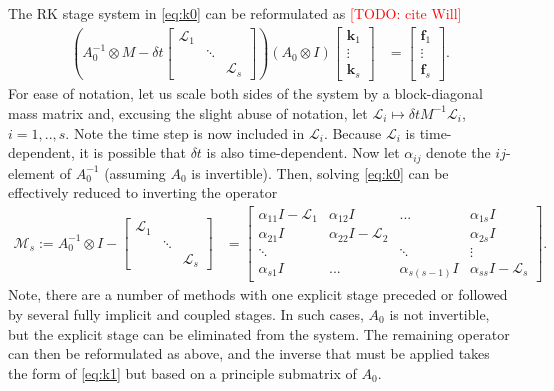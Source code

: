 \documentclass[a4paper,10pt]{article}
\makeatletter
\newcommand{\todo}[1]{\textcolor{red}{[TODO\@: #1]}}
\makeatother
\begin{document}
The RK stage system in \eqref{eq:k0} can be reformulated as \todo{cite Will}
%
\begin{align*}
\left( A_0^{-1}\otimes M - \delta t \begin{bmatrix} \mathcal{L}_1  & \\ & \ddots \\ && \mathcal{L}_s\end{bmatrix}\right)
	(A_0\otimes I)	\begin{bmatrix} \mathbf{k}_1 \\ \vdots \\ \mathbf{k}_s \end{bmatrix} 
& = \begin{bmatrix} \mathbf{f}_1 \\ \vdots \\ \mathbf{f}_s \end{bmatrix}.
\end{align*}
%
For ease of notation, let us scale both sides of the system by a block-diagonal mass matrix 
and, excusing the slight abuse of notation, let $\mathcal{L}_i \mapsto \delta t M^{-1}\mathcal{L}_i$,
$i=1,..,s$. Note the time step is now included in $\mathcal{L}_i$. Because $\mathcal{L}_i$ is
time-dependent, it is possible that $\delta t$ is also time-dependent.
Now let $\alpha_{ij}$ denote the $ij$-element of $A_0^{-1}$ (assuming $A_0$ is
invertible). Then, solving \eqref{eq:k0} can be effectively reduced to inverting the operator
%
\begin{align}\label{eq:k1}
\mathcal{M}_s := A_0^{-1}\otimes I - \begin{bmatrix} \mathcal{L}_1  & \\ & \ddots \\ && \mathcal{L}_s\end{bmatrix}
	& = 
\begin{bmatrix} \alpha_{11}I - \mathcal{L}_1 & \alpha_{12}I & ... & \alpha_{1s}I \\
	\alpha_{21}I & \alpha_{22}I - \mathcal{L}_2 & & \alpha_{2s}I \\
	\ddots & & \ddots & \vdots \\ \alpha_{s1}I & ... & \alpha_{s(s-1)}I & \alpha_{ss}I - \mathcal{L}_s \end{bmatrix}.
\end{align}
%
Note, there are a number of methods with one explicit stage preceded or followed by several
fully implicit and coupled stages. In such cases, $A_0$ is
not invertible, but the explicit stage can be eliminated from the system. The remaining operator
can then be reformulated as above, and the inverse that must be applied takes the form of
\eqref{eq:k1} but based on a principle submatrix of $A_0$.
\end{document}
